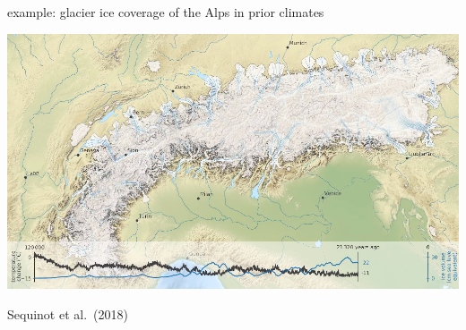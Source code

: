\documentclass[svgnames,
               hyperref={colorlinks,citecolor=DeepPink4,linkcolor=FireBrick,urlcolor=Maroon},
               usepdftitle=false]  %
               {beamer}
\begin{document}
\begin{frame}{example: glacier ice coverage of the Alps in prior climates}

\includegraphics[width=1.02\textwidth]{../talk-oxford/images/alps-seguinot2018.png}

\vspace{-2mm}
\hfill {\tiny Sequinot et al.~(2018)}
\end{frame}
\end{document}
